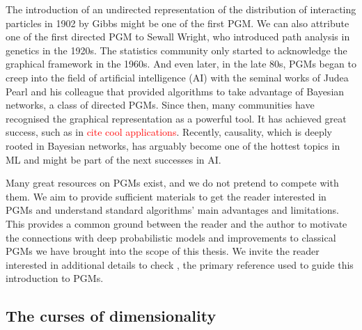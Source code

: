 The introduction of an undirected representation of the distribution of interacting particles in 1902 by Gibbs might be one of the first PGM. We can also attribute one of the first directed PGM to Sewall Wright, who introduced path analysis in genetics in the 1920s. The statistics community only started to acknowledge the graphical framework in the 1960s. And even later, in the late 80s, PGMs began to creep into the field of artificial intelligence (AI) with the seminal works of Judea Pearl and his colleague that provided algorithms to take advantage of Bayesian networks, a class of directed PGMs. Since then, many communities have recognised the graphical representation as a powerful tool. It has achieved great success, such as in \textcolor{red}{cite cool applications}. Recently, causality, which is deeply rooted in Bayesian networks, has arguably become one of the hottest topics in ML and might be part of the next successes in AI.

Many great resources on PGMs exist, and we do not pretend to compete with them. We aim to provide sufficient materials to get the reader interested in PGMs and understand standard algorithms' main advantages and limitations. This provides a common ground between the reader and the author to motivate the connections with deep probabilistic models and improvements to classical PGMs we have brought into the scope of this thesis. We invite the reader interested in additional details to check \citet{koller_probabilistic_2009}, the primary reference used to guide this introduction to PGMs.

\subsection{The curses of dimensionality}
